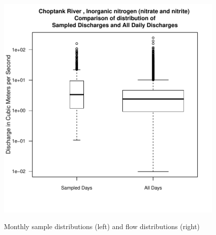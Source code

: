 \documentclass[a4paper,11pt]{article}
\begin{document}
\begin{figure}[htbp]
\begin{minipage}[h]{0.5\linewidth}
\begin{center}
\includegraphics{EGRET-figboxQTwice}
    \label{fig:boxQTwice}
    \end{center}
  \end{minipage}
  \caption{Monthly sample distributions (left) and flow distributions (right)}
  \label{fig:boxConcMonthANDboxQTwice}
\end{figure}
\end{document}
